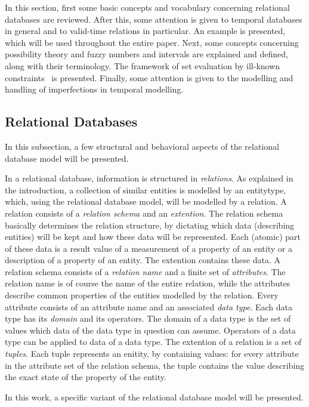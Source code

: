 In this section, first some basic concepts and vocabulary concerning relational databases are reviewed. After this, some attention is given to temporal databases in general and to valid-time relations in particular. An example is presented, which will be used throughout the entire paper. Next, some concepts concerning possibility theory and fuzzy numbers and intervals are explained and defined, along with their terminology. The framework of set evaluation by ill-known constraints~\cite{Pons2011} is presented. Finally, some attention is given to the modelling and handling of imperfections in temporal modelling.


\subsection{Relational Databases}
In this subsection, a few structural and behavioral aspects of the relational database model will be presented.

In a relational database, information is structured in \emph{relations}. As explained in the introduction, a collection of similar entities is modelled by an entitytype, which, using the relational database model, will be modelled by a relation. A relation consists of a \emph{relation schema} and an \emph{extention}. The relation schema basically determines the relation structure, by dictating which data (describing entities) will be kept and how these data will be represented. Each (atomic) part of these data is a result value of a measurement of a property of an entity or a description of a property of an entity. The extention contains these data. A relation schema consists of a \emph{relation name} and a finite set of \emph{attributes}. The relation name is of course the name of the entire relation, while the attributes describe common properties of the entities modelled by the relation. Every attribute consists of an attribute name and an associated \emph{data type}. Each data type has its \emph{domain} and its operators. The domain of a data type is the set of values which data of the data type in question can assume. Operators of a data type can be applied to data of a data type. The extention of a relation is a set of \emph{tuples}. Each tuple represents an enitity, by containing values: for every attribute in the attribute set of the relation schema, the tuple contains the value describing the exact state of the property of the entity. %

In this work, a specific variant of the relational database model will be presented.